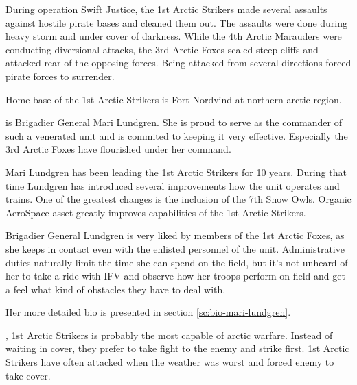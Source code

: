 \documentclass{tufte-book}
\begin{document}
During operation Swift Justice, the 1st Arctic Strikers made several assaults
against hostile pirate bases and cleaned them out. The assaults were done
during heavy storm and under cover of darkness. While the 4th Arctic Marauders
were conducting diversional attacks, the 3rd Arctic Foxes scaled steep cliffs
and attacked rear of the opposing forces. Being attacked from several
directions forced pirate forces to surrender.

Home base of the 1st Arctic Strikers is Fort Nordvind at northern arctic
region.

 is Brigadier General Mari
Lundgren. She is proud to serve as the commander of such a venerated unit and
is commited to keeping it very effective. Especially the 3rd Arctic
Foxes have flourished under her command.

Mari Lundgren has been leading the 1st Arctic Strikers for 10 years. During
that time Lundgren has introduced several improvements how the unit operates
and trains. One of the greatest changes is the inclusion of the 7th Snow Owls.
Organic AeroSpace asset greatly improves capabilities of the 1st Arctic
Strikers.

Brigadier General Lundgren is very liked by members of the 1st Arctic Foxes,
as she keeps in contact even with the enlisted personnel of the unit.
Administrative duties naturally limit the time she can spend on the field,
but it's not unheard of her to take a ride with IFV and observe how her troops
perform on field and get a feel what kind of obstacles they have to deal with.

Her more detailed bio is presented in section \ref{sc:bio-mari-lundgren}.

, 1st Arctic Strikers is probably the
most capable of arctic warfare. Instead of waiting in cover, they prefer to
take fight to the enemy and strike first. 1st Arctic Strikers have often
attacked when the weather was worst and forced enemy to take cover.



\bigskip
{}
\end{document}
